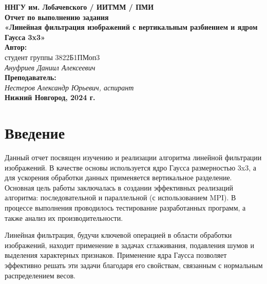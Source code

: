\documentclass[12pt]{article}
\begin{document}

\begin{titlepage}
    \begin{center}
        \large 
        \textbf{ННГУ им. Лобачевского / ИИТММ / ПМИ}\\[0.5cm]
        
        \vspace{4cm}
        \textbf{\Large Отчет по выполнению задания}\\
        \textbf{\large «Линейная фильтрация изображений с вертикальным разбиением и ядром Гаусса 3x3»}\\[3cm]
        
        \vspace{3cm}
        \textbf{Автор:}\\
        студент группы 3822Б1ПМоп3 \\
        \textit{Ануфриев Даниил Алексеевич}\\[1cm]

        \textbf{Преподаватель:}\\
         \textit{Нестеров Александр Юрьевич, аспирант}\\[2cm]
        
        \vfill
        \textbf{Нижний Новгород, 2024 г.}
    \end{center}
\end{titlepage}

\tableofcontents
\newpage


\section*{Введение}

Данный отчет посвящен изучению и реализации алгоритма линейной фильтрации изображений. В качестве основы используется ядро Гаусса размерностью 3x3, а для ускорения обработки данных применяется вертикальное разделение. Основная цель работы заключалась в создании эффективных реализаций алгоритма: последовательной и параллельной (с использованием MPI). В процессе выполнения проводилось тестирование разработанных программ, а также анализ их производительности.

Линейная фильтрация, будучи ключевой операцией в области обработки изображений, находит применение в задачах сглаживания, подавления шумов и выделения характерных признаков. Применение ядра Гаусса позволяет эффективно решать эти задачи благодаря его свойствам, связанным с нормальным распределением весов.
\end{document}
